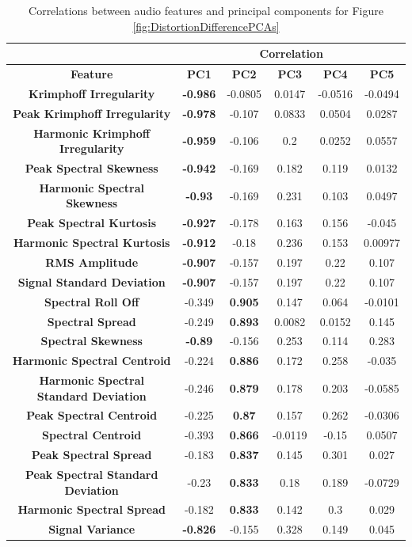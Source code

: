 		\begin{table}[h!]
			\centering
			\begin{tabular}{|c|c|c|c|c|c|}
				\cline{2-6}
				\multicolumn{1}{c|}{} & \multicolumn{5}{c|}{\bf{Correlation}} \tabularnewline
				\hline
				\bf{Feature} & \bf{PC1} & \bf{PC2} & \bf{PC3} & \bf{PC4} & \bf{PC5} \tabularnewline
				\hline
				\hline
				\bf{Krimphoff Irregularity} & \bf{-0.986} & -0.0805 & 0.0147 & -0.0516 & -0.0494 \tabularnewline
				\hline
				\bf{Peak Krimphoff Irregularity} & \bf{-0.978} & -0.107 & 0.0833 & 0.0504 & 0.0287 \tabularnewline
				\hline
				\bf{Harmonic Krimphoff Irregularity} & \bf{-0.959} & -0.106 & 0.2 & 0.0252 & 0.0557 \tabularnewline
				\hline
				\bf{Peak Spectral Skewness} & \bf{-0.942} & -0.169 & 0.182 & 0.119 & 0.0132 \tabularnewline
				\hline
				\bf{Harmonic Spectral Skewness} & \bf{-0.93} & -0.169 & 0.231 & 0.103 & 0.0497 \tabularnewline
				\hline
				\bf{Peak Spectral Kurtosis} & \bf{-0.927} & -0.178 & 0.163 & 0.156 & -0.045 \tabularnewline
				\hline
				\bf{Harmonic Spectral Kurtosis} & \bf{-0.912} & -0.18 & 0.236 & 0.153 & 0.00977 \tabularnewline
				\hline
				\bf{RMS Amplitude} & \bf{-0.907} & -0.157 & 0.197 & 0.22 & 0.107 \tabularnewline
				\hline
				\bf{Signal Standard Deviation} & \bf{-0.907} & -0.157 & 0.197 & 0.22 & 0.107 \tabularnewline
				\hline
				\bf{Spectral Roll Off} & -0.349 & \bf{0.905} & 0.147 & 0.064 & -0.0101 \tabularnewline
				\hline
				\bf{Spectral Spread} & -0.249 & \bf{0.893} & 0.0082 & 0.0152 & 0.145 \tabularnewline
				\hline
				\bf{Spectral Skewness} & \bf{-0.89} & -0.156 & 0.253 & 0.114 & 0.283 \tabularnewline
				\hline
				\bf{Harmonic Spectral Centroid} & -0.224 & \bf{0.886} & 0.172 & 0.258 & -0.035 \tabularnewline
				\hline
				\bf{Harmonic Spectral Standard Deviation} & -0.246 & \bf{0.879} & 0.178 & 0.203 & -0.0585 \tabularnewline
				\hline
				\bf{Peak Spectral Centroid} & -0.225 & \bf{0.87} & 0.157 & 0.262 & -0.0306 \tabularnewline
				\hline
				\bf{Spectral Centroid} & -0.393 & \bf{0.866} & -0.0119 & -0.15 & 0.0507 \tabularnewline
				\hline
				\bf{Peak Spectral Spread} & -0.183 & \bf{0.837} & 0.145 & 0.301 & 0.027 \tabularnewline
				\hline
				\bf{Peak Spectral Standard Deviation} & -0.23 & \bf{0.833} & 0.18 & 0.189 & -0.0729 \tabularnewline
				\hline
				\bf{Harmonic Spectral Spread} & -0.182 & \bf{0.833} & 0.142 & 0.3 & 0.029 \tabularnewline
				\hline
				\bf{Signal Variance} & \bf{-0.826} & -0.155 & 0.328 & 0.149 & 0.045 \tabularnewline
				\hline
			\end{tabular}
			\caption{Correlations between audio features and principal components for Figure
				 \ref{fig:DistortionDifferencePCAs}}
			\label{fig:DistortionDifferenceCorrelations}
		\end{table}

